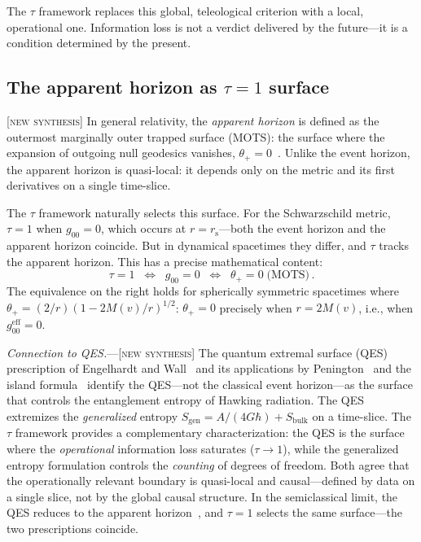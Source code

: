 \documentclass[prl,twocolumn,superscriptaddress,longbibliography,floatfix]{revtex4-2}
\newcommand{\tauasym}{\tau}
\newcommand{\rs}{r_{\mathrm{s}}}
\begin{document}
The $\tauasym$ framework replaces this global,
teleological criterion with a local, operational one.
Information loss is not a verdict delivered by the
future---it is a condition determined by the present.

\subsection{The apparent horizon as $\tauasym = 1$ surface}
\label{sec:apparent_horizon}

[\textsc{new synthesis}]
In general relativity, the \emph{apparent horizon}
is defined as the outermost marginally outer trapped
surface (MOTS): the surface where the expansion
of outgoing null geodesics vanishes,
$\theta_{+} = 0$~\cite{Hayward1994}.
Unlike the event horizon, the apparent horizon
is quasi-local: it depends only on the metric and its
first derivatives on a single time-slice.

The $\tauasym$ framework naturally selects this surface.
For the Schwarzschild metric, $\tauasym = 1$ when
$g_{00} = 0$, which occurs at $r = \rs$---both the
event horizon and the apparent horizon coincide.
But in dynamical spacetimes they differ, and $\tauasym$
tracks the apparent horizon.
This has a precise mathematical content:
\begin{equation}
  \tauasym = 1 \;\;\Longleftrightarrow\;\;
  g_{00} = 0 \;\;\Longleftrightarrow\;\;
  \theta_{+} = 0 \;\text{(MOTS)}\,.
  \label{eq:tau_MOTS}
\end{equation}
The equivalence on the right holds for spherically
symmetric spacetimes where
$\theta_{+} = (2/r)(1 - 2M(v)/r)^{1/2}$:
$\theta_{+} = 0$ precisely when $r = 2M(v)$,
i.e., when $g_{00}^{\text{eff}} = 0$.

\emph{Connection to QES.}---[\textsc{new synthesis}]
The quantum extremal surface (QES) prescription of
Engelhardt and Wall~\cite{Engelhardt2015}
and its applications by
Penington~\cite{Penington2020} and the island
formula~\cite{AEMM2021} identify the QES---not the
classical event horizon---as the surface that controls
the entanglement entropy of Hawking radiation.
The QES extremizes the \emph{generalized} entropy
$S_{\text{gen}} = A/(4G\hbar) + S_{\text{bulk}}$
on a time-slice.
The $\tauasym$ framework provides a complementary
characterization: the QES is the surface where the
\emph{operational} information loss saturates
($\tauasym \to 1$), while the generalized entropy
formulation controls the \emph{counting} of degrees
of freedom.
Both agree that the operationally relevant boundary
is quasi-local and causal---defined by data on a single
slice, not by the global causal structure.
In the semiclassical limit, the QES reduces to the
apparent horizon~\cite{Engelhardt2015}, and $\tauasym = 1$
selects the same surface---the two prescriptions coincide.
\end{document}
